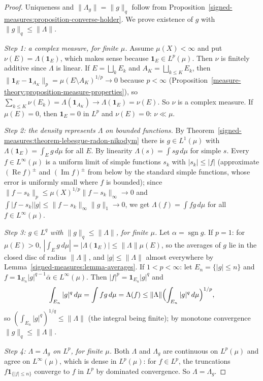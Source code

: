 \begin{proof}
Uniqueness and $\|\Lambda_g\| = \|g\|_q$ follow from Proposition~\ref{signed-measures:proposition-converse-holder}. We prove existence of $g$ with $\|g\|_q \leq \|\Lambda\|$.

\emph{Step 1: a complex measure, for finite $\mu$.} Assume $\mu(X) < \infty$ and put $\nu(E) = \Lambda(\mathbf{1}_E)$, which makes sense because $\mathbf{1}_E \in L^p(\mu)$. Then $\nu$ is finitely
additive since $\Lambda$ is linear. If $E = \bigsqcup_kE_k$ and $A_K = \bigsqcup_{k \leq K}E_k$, then $\|\mathbf{1}_E - \mathbf{1}_{A_K}\|_p = \mu(E \setminus A_K)^{1/p} \to 0$ because $p < \infty$
(Proposition~\ref{measure-theory:proposition-measure-properties}), so $\sum_{k \leq K}\nu(E_k) = \Lambda(\mathbf{1}_{A_K}) \to \Lambda(\mathbf{1}_E) = \nu(E)$. So $\nu$ is a complex measure. If
$\mu(E) = 0$, then $\mathbf{1}_E = 0$ in $L^p$ and $\nu(E) = 0$: $\nu \ll \mu$.

\emph{Step 2: the density represents $\Lambda$ on bounded functions.} By Theorem~\ref{signed-measures:theorem-lebesgue-radon-nikodym} there is $g \in L^1(\mu)$ with $\Lambda(\mathbf{1}_E) = \int_Eg\,d\mu$
for all $E$. By linearity $\Lambda(s) = \int sg\,d\mu$ for simple $s$. Every $f \in L^\infty(\mu)$ is a uniform limit of simple functions $s_k$ with $|s_k| \leq |f|$ (approximate $(\operatorname{Re}f)^\pm$
and $(\operatorname{Im}f)^\pm$ from below by the standard simple functions, whose error is uniformly small where $f$ is bounded); since $\|f - s_k\|_p \leq \mu(X)^{1/p}\|f - s_k\|_\infty \to 0$ and
$\int|f - s_k||g| \leq \|f - s_k\|_\infty\|g\|_1 \to 0$, we get $\Lambda(f) = \int fg\,d\mu$ for all $f \in L^\infty(\mu)$.

\emph{Step 3: $g \in L^q$ with $\|g\|_q \leq \|\Lambda\|$, for finite $\mu$.} Let $\alpha = \operatorname{sgn}g$. If $p = 1$: for $\mu(E) > 0$,
$|\int_Eg\,d\mu| = |\Lambda(\mathbf{1}_E)| \leq \|\Lambda\|\mu(E)$, so the averages of $g$ lie in the closed disc of radius $\|\Lambda\|$, and $|g| \leq \|\Lambda\|$ almost everywhere by
Lemma~\ref{signed-measures:lemma-averages}. If $1 < p < \infty$: let $E_n = \{|g| \leq n\}$ and $f = \mathbf{1}_{E_n}|g|^{q-1}\bar\alpha \in L^\infty(\mu)$. Then $|f|^p = \mathbf{1}_{E_n}|g|^q$ and
\[
\int_{E_n}|g|^q\,d\mu = \int fg\,d\mu = \Lambda(f) \leq \|\Lambda\|\Bigl(\int_{E_n}|g|^q\,d\mu\Bigr)^{1/p},
\]
so $(\int_{E_n}|g|^q)^{1/q} \leq \|\Lambda\|$ (the integral being finite); by monotone convergence $\|g\|_q \leq \|\Lambda\|$.

\emph{Step 4: $\Lambda = \Lambda_g$ on $L^p$, for finite $\mu$.} Both $\Lambda$ and $\Lambda_g$ are continuous on $L^p(\mu)$ and agree on $L^\infty(\mu)$, which is dense in $L^p(\mu)$: for $f \in L^p$, the
truncations $f\mathbf{1}_{\{|f| \leq n\}}$ converge to $f$ in $L^p$ by dominated convergence. So $\Lambda = \Lambda_g$.


\end{proof}
